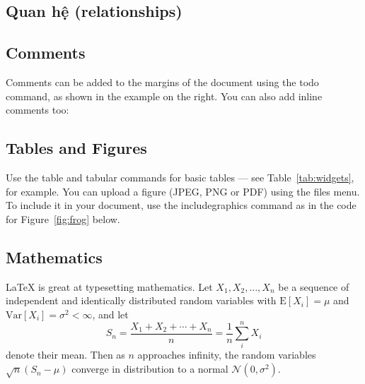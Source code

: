 \subsection{Quan hệ (relationships)}

\subsection{Comments}

Comments can be added to the margins of the document using the  todo command, as shown in the example on the right. You can also add inline comments too:


\subsection{Tables and Figures}

Use the table and tabular commands for basic tables --- see Table~\ref{tab:widgets}, for example. You can upload a figure (JPEG, PNG or PDF) using the files menu. To include it in your document, use the includegraphics command as in the code for Figure~\ref{fig:frog} below.



\subsection{Mathematics}

\LaTeX{} is great at typesetting mathematics. Let $X_1, X_2, \ldots, X_n$ be a sequence of independent and identically distributed random variables with $\text{E}[X_i] = \mu$ and $\text{Var}[X_i] = \sigma^2 < \infty$, and let
$$S_n = \frac{X_1 + X_2 + \cdots + X_n}{n}
      = \frac{1}{n}\sum_{i}^{n} X_i$$
denote their mean. Then as $n$ approaches infinity, the random variables $\sqrt{n}(S_n - \mu)$ converge in distribution to a normal $\mathcal{N}(0, \sigma^2)$.

